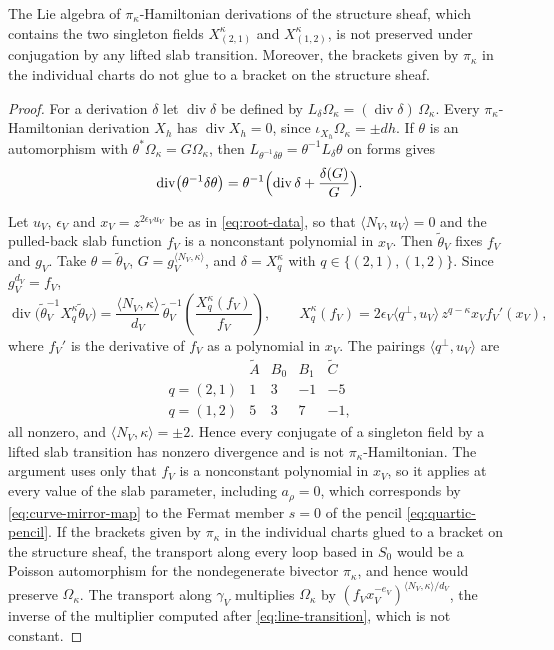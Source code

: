\begin{proposition}\label{prop:no-scalar-frame}
The Lie algebra of $\pi_\kappa$-Hamiltonian derivations of the structure
sheaf, which contains the two singleton fields $X^\kappa_{(2,1)}$ and
$X^\kappa_{(1,2)}$, is not preserved under conjugation by any lifted slab
transition.  Moreover, the brackets given by $\pi_\kappa$ in the
individual charts do not glue to a bracket on the structure sheaf.
\end{proposition}

\begin{proof}
For a derivation $\delta$ let $\operatorname{div}\delta$ be defined by
$L_\delta\Omega_\kappa=(\operatorname{div}\delta)\,\Omega_\kappa$.  Every
$\pi_\kappa$-Hamiltonian derivation $X_h$ has
$\operatorname{div}X_h=0$, since $\iota_{X_h}\Omega_\kappa=\pm dh$.  If
$\theta$ is an automorphism with $\theta^*\Omega_\kappa=G\Omega_\kappa$, then
$L_{\theta^{-1}\delta\theta}=\theta^{-1}L_\delta\theta$ on forms gives
\[
 \operatorname{div}\bigl(\theta^{-1}\delta\theta\bigr)
 =\theta^{-1}\Bigl(\operatorname{div}\delta+\frac{\delta(G)}{G}\Bigr).
\]

Let $u_V$, $\epsilon_V$ and $x_V=z^{2\epsilon_Vu_V}$ be as in
\eqref{eq:root-data}, so that $\langle N_V,u_V\rangle=0$ and the pulled-back
slab function $f_V$ is a nonconstant polynomial in $x_V$.  Then
$\widetilde\theta_V$ fixes $f_V$ and $g_V$.  Take $\theta=\widetilde\theta_V$,
$G=g_V^{\langle N_V,\kappa\rangle}$, and $\delta=X_q^\kappa$ with
$q\in\{(2,1),(1,2)\}$.  Since $g_V^{d_V}=f_V$,
\[
 \operatorname{div}\bigl(\widetilde\theta_V^{-1}X_q^\kappa\widetilde\theta_V\bigr)
 =\frac{\langle N_V,\kappa\rangle}{d_V}\,
  \widetilde\theta_V^{-1}\!\left(\frac{X_q^\kappa(f_V)}{f_V}\right),
 \qquad
 X_q^\kappa(f_V)=2\epsilon_V\langle q^\perp,u_V\rangle\,z^{q-\kappa}x_Vf_V'(x_V),
\]
where $f_V'$ is the derivative of $f_V$ as a polynomial in $x_V$.  The
pairings $\langle q^\perp,u_V\rangle$ are
\[
\begin{array}{c|rrrr}
  &\widetilde A&B_0&B_1&\widetilde C\\ \hline
 q=(2,1)&1&3&-1&-5\\
 q=(1,2)&5&3&7&-1,
\end{array}
\]
all nonzero, and $\langle N_V,\kappa\rangle=\pm2$.  Hence every conjugate of
a singleton field by a lifted slab transition has nonzero divergence and is
not $\pi_\kappa$-Hamiltonian.  The argument uses only that $f_V$ is a
nonconstant polynomial in $x_V$, so it applies at every value of the
slab parameter, including $a_\rho=0$, which corresponds by
\eqref{eq:curve-mirror-map} to the Fermat member $s=0$ of the pencil
\eqref{eq:quartic-pencil}.  If the brackets
given by $\pi_\kappa$ in the individual charts glued to a bracket on the
structure sheaf, the transport along every loop based in $S_0$ would be a
Poisson automorphism for the nondegenerate bivector $\pi_\kappa$, and hence
would preserve $\Omega_\kappa$.  The transport along $\gamma_V$ multiplies
$\Omega_\kappa$ by $(f_Vx_V^{-e_V})^{\langle N_V,\kappa\rangle/d_V}$, the
inverse of the multiplier computed after \eqref{eq:line-transition}, which
is not constant.
\end{proof}

